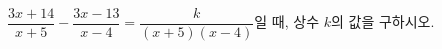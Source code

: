 \hspace*{2mm}\begin{minipage}[t]{\dimexpr\linewidth-2mm\relax}\vspace{0pt}
$\dfrac{3x+14}{x+5}-\dfrac{3x-13}{x-4}=\dfrac{k}{(x+5)(x-4)}$일 때, 상수 $k$의 값을 구하시오.\end{minipage}
